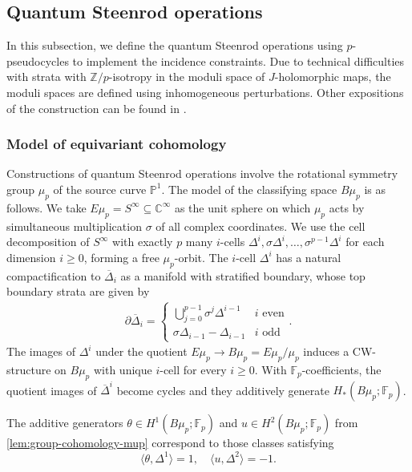 \documentclass[reqno]{amsart}
\numberwithin{equation}{section}
\numberwithin{equation}{section}
\numberwithin{equation}{section}
\theoremstyle{definition}
\theoremstyle{remark}
\theoremstyle{remark}
\newcommand{\ov}{\overline}
\begin{document}
\subsection{Quantum Steenrod operations}\label{subsec:qst}

In this subsection, we define the quantum Steenrod operations using $p$-pseudocycles to implement the incidence constraints. Due to technical difficulties with strata with $\mathbb{Z}/p$-isotropy in the moduli space of $J$-holomorphic maps, the moduli spaces are defined using inhomogeneous perturbations. Other expositions of the construction can be found in \cite{seidel-wilkins, Lee23a, Lee23b}.

\subsubsection{Model of equivariant cohomology}
Constructions of quantum Steenrod operations involve the rotational symmetry group $\mu_p$ of the source curve $\mathbb{P}^1$. The model of the classifying space $B\mu_p$ is as follows. We take $E\mu_p = S^\infty \subseteq \mathbb{C}^\infty$ as the unit sphere on which $\mu_p$ acts by simultaneous multiplication $\sigma$ of all complex coordinates.  We use the cell decomposition of $S^\infty$ \cite[Section 2a]{seidel-wilkins} with exactly $p$ many $i$-cells $\Delta^i, \sigma \Delta^i, \dots, \sigma^{p-1} \Delta^i$ for each dimension $i \ge 0$, forming a free $\mu_p$-orbit. The $i$-cell $\Delta^i$ has a natural compactification to $\ov{\Delta}_i$ as a manifold with stratified boundary, whose top boundary strata are given by 
\begin{align}
    \partial \ov{\Delta}_{i} = \begin{cases} \bigcup_{j=0}^{p-1} \sigma^j \Delta^{i-1} & i \mbox{ even} \\ \sigma \Delta_{i-1} - \Delta_{i-1} & i \mbox{ odd} \end{cases}.
\end{align}
The images of $\Delta^i$ under the quotient $E\mu_p \to B\mu_p = E\mu_p / \mu_p$ induces a CW-structure on $B\mu_p$ with unique $i$-cell for every $i \ge 0$. With $\mathbb{F}_p$-coefficients, the quotient images of $\ov{\Delta}^i$ become cycles and they additively generate $H_*(B\mu_p;\mathbb{F}_p)$.

The additive generators $\theta \in H^1(B\mu_p; \mathbb{F}_p)$ and $u \in H^2(B\mu_p;\mathbb{F}_p)$ from \cref{lem:group-cohomology-mup} correspond to those classes satisfying
\begin{equation}
    \langle \theta, \Delta^1 \rangle =1, \quad \langle u, \Delta^2 \rangle = -1.
\end{equation}
\end{document}
